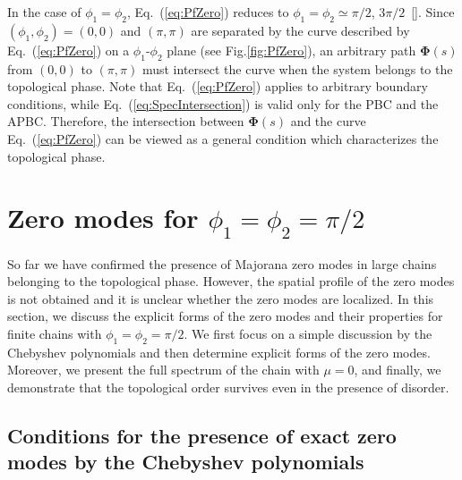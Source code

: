 \documentclass[aps, prb, showpacs, twocolumn, %
amssymb,superscriptaddress]{revtex4}
\begin{document}
In the case of $\phi_{1} = \phi_{2}$, Eq.~(\ref{eq:PfZero}) reduces to $\phi_{1} = \phi_{2} \simeq \pi/2$, $3\pi/2$~[]. 
Since $\left( \phi_{1}, \phi_{2} \right)=(0,0)$ and $(\pi,\pi)$ are separated by the curve described by Eq.~(\ref{eq:PfZero}) on a $\phi_{1}$-$\phi_{2}$ plane (see Fig.\ref{fig:PfZero}), an arbitrary path ${\bm \Phi}(s)$ from $(0,0)$ to $(\pi,\pi)$ must intersect the curve when the system belongs to the topological phase. 
Note that Eq.~(\ref{eq:PfZero}) applies to arbitrary boundary conditions, while Eq.~(\ref{eq:SpecIntersection}) is valid only for the PBC and the APBC. Therefore, the intersection between ${\bm \Phi}(s)$ and the curve Eq.~(\ref{eq:PfZero}) can be viewed as a general condition which characterizes the topological phase.


\section{Zero modes for $\phi_{1} = \phi_{2} = \pi/2$}
\label{sec:exact zero modes}

So far we have confirmed the presence of Majorana zero modes in large chains belonging to the topological phase. However, the spatial profile of the zero modes is not obtained and it is unclear whether the zero modes are localized. In this section, we discuss the explicit forms of the zero modes and their properties for finite chains with $\phi_{1} = \phi_{2} = \pi/2$. We first focus on a simple discussion by the Chebyshev polynomials and then determine explicit forms of the zero modes. Moreover, we present the full spectrum of the chain with $\mu=0$, and finally, we demonstrate that the topological order survives even in the presence of disorder.

\subsection{Conditions for the presence of exact zero modes by the Chebyshev polynomials}
\label{sec:Chebyshev}
\end{document}
